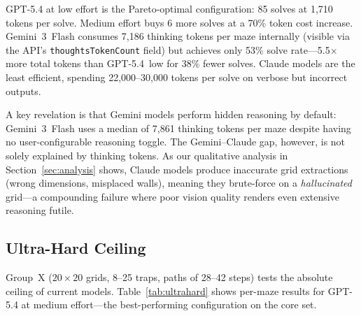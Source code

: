 \documentclass[11pt]{article}
\begin{document}
GPT-5.4 at low effort is the Pareto-optimal configuration: 85 solves at 1,710 tokens per solve.
Medium effort buys 6 more solves at a 70\% token cost increase.
Gemini~3~Flash consumes 7,186 thinking tokens per maze internally (visible via the API's \texttt{thoughtsTokenCount} field) but achieves only 53\% solve rate---5.5$\times$ more total tokens than GPT-5.4~low for 38\% fewer solves.
Claude models are the least efficient, spending 22,000--30,000 tokens per solve on verbose but incorrect outputs.

A key revelation is that Gemini models perform hidden reasoning by default: Gemini~3~Flash uses a median of 7,861 thinking tokens per maze despite having no user-configurable reasoning toggle.
The Gemini--Claude gap, however, is not solely explained by thinking tokens.
As our qualitative analysis in Section~\ref{sec:analysis} shows, Claude models produce inaccurate grid extractions (wrong dimensions, misplaced walls), meaning they brute-force on a \emph{hallucinated} grid---a compounding failure where poor vision quality renders even extensive reasoning futile.

\subsection{Ultra-Hard Ceiling}
\label{sec:ultrahard}

Group~X ($20 \times 20$ grids, 8--25 traps, paths of 28--42 steps) tests the absolute ceiling of current models.
Table~\ref{tab:ultrahard} shows per-maze results for GPT-5.4 at medium effort---the best-performing configuration on the core set.
\end{document}
